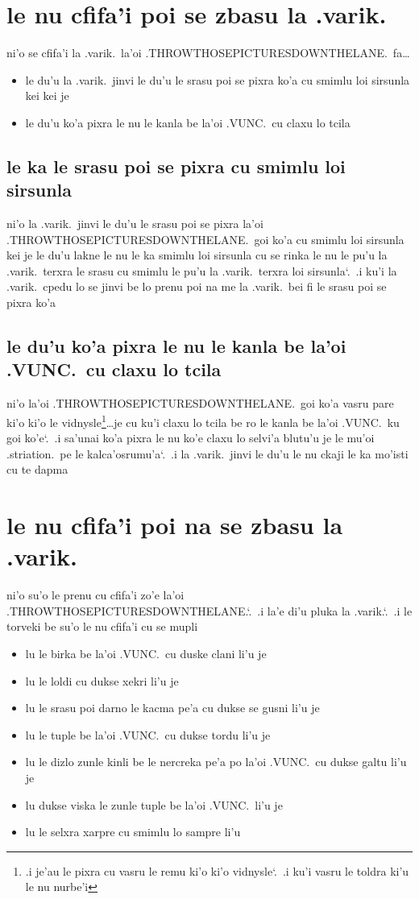 \documentclass{report}
\newcommand\sds{\spacefactor\sfcode`.\ \space}
\begin{document}
\section{le nu cfifa'i poi se zbasu la .varik.}
ni'o se cfifa'i la .varik.\ la'oi .THROWTHOSEPICTURESDOWNTHELANE.\ fa\ldots
\begin{itemize}
	\item le du'u la .varik.\ jinvi le du'u le srasu poi se pixra ko'a cu smimlu loi sirsunla kei kei je
	\item le du'u ko'a pixra le nu le kanla be la'oi .VUNC.\ cu claxu lo tcila
\end{itemize}

\subsection{le ka le srasu poi se pixra cu smimlu loi sirsunla}
ni'o la .varik.\ jinvi le du'u le srasu poi se pixra la'oi .THROWTHOSEPICTURESDOWNTHELANE.\ goi ko'a cu smimlu loi sirsunla kei je le du'u lakne le nu le ka smimlu loi sirsunla cu se rinka le nu le pu'u la .varik.\ terxra le srasu cu smimlu le pu'u la .varik.\ terxra loi sirsunla\sds  .i ku'i la .varik.\ cpedu lo se jinvi be lo prenu poi na me la .varik.\ bei fi le srasu poi se pixra ko'a

\subsection{le du'u ko'a pixra le nu le kanla be la'oi .VUNC.\ cu claxu lo tcila}
ni'o la'oi .THROWTHOSEPICTURESDOWNTHELANE.\ goi ko'a vasru pare ki'o ki'o le vidnysle\footnote{.i je'au le pixra cu vasru le remu ki'o ki'o vidnysle\sds  .i ku'i vasru le toldra ki'u le nu nurbe'i}\ldots je cu ku'i claxu lo tcila be ro le kanla be la'oi .VUNC.\ ku goi ko'e\sds  .i sa'unai ko'a pixra le nu ko'e claxu lo selvi'a blutu'u je le mu'oi .striation.\ pe le kalca'osrumu'a\sds  .i la .varik.\ jinvi le du'u le nu ckaji le ka mo'isti cu te dapma

\section{le nu cfifa'i poi na se zbasu la .varik.}
ni'o su'o le prenu cu cfifa'i zo'e la'oi .THROWTHOSEPICTURESDOWNTHELANE.\sds  .i la'e di'u pluka la .varik.\sds  .i le torveki be su'o le nu cfifa'i cu se mupli
\begin{itemize}
	\item lu le birka be la'oi .VUNC.\ cu duske clani li'u je
	\item lu le loldi cu dukse xekri li'u je
	\item lu le srasu poi darno le kacma pe'a cu dukse se gusni li'u je
	\item lu le tuple be la'oi .VUNC.\ cu dukse tordu li'u je
	\item lu le dizlo zunle kinli be le nercreka pe'a po la'oi .VUNC.\ cu dukse galtu li'u je
	\item lu dukse viska le zunle tuple be la'oi .VUNC.\ li'u je
	\item lu le selxra xarpre cu smimlu lo sampre li'u
\end{itemize}
\end{document}
